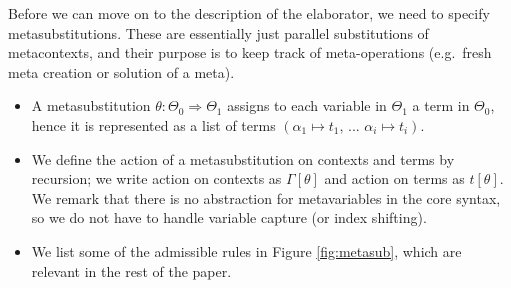 \documentclass[acmsmall,review,anonymous,prologue,dvipsnames]{acmart}\settopmatter{printfolios=true,printccs=false,printacmref=false}
\newcommand{\To}{\Rightarrow}
\theoremstyle{remark}
\begin{document}
Before we can move on to the description of the elaborator, we need to specify
metasubstitutions. These are essentially just parallel substitutions of
metacontexts, and their purpose is to keep track of meta-operations (e.g.\ fresh
meta creation or solution of a meta).

\begin{itemize}
  \item
    A metasubstitution $\theta : \Theta_0 \To \Theta_1$ assigns to each variable
    in $\Theta_1$ a term in $\Theta_0$, hence it is represented as a list of
    terms $(\alpha_1 \mapsto t_1,\,...\,\,\alpha_i \mapsto t_i)$.
  \item
    We define the action of a metasubstitution on contexts and terms by
    recursion; we write action on contexts as $\Gamma[\theta]$ and action on
    terms as $t[\theta]$. We remark that there is no abstraction for
    metavariables in the core syntax, so we do not have to handle variable
    capture (or index shifting).
  \item
    We list some of the admissible rules in Figure \ref{fig:metasub}, which
    are relevant in the rest of the paper.
\end{itemize}
\end{document}
